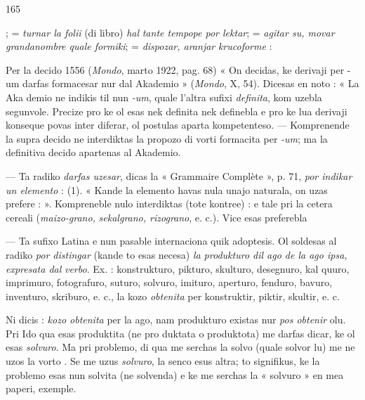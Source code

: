 \begin{VUpage}[169]{165}

\VUcontinue
{};  = \textit{turnar la folii} (di libro) \textit{hal}\cc
\textit{tante tempope por lektar};  = \textit{agitar su, movar}\nl
\textit{grandanombre quale formiki};  = \textit{dispozar, aranjar}\nl
\textit{krucoforme} : \nl
{}

Per la decido 1556 (\textit{Mondo}, marto 1922, pag. 68) « On\nl
decidas, ke derivaji per -um darfas formacesar nur dal\nl
Akademio » (\textit{Mondo}, X, 54). Dicesas en noto : « La Aka\cc
demio ne indikis til nun \textit{-um}, quale l'altra sufixi \textit{definita},\nl
kom uzebla segunvole. Precize pro ke ol esas nek definita\nl
nek definebla e pro ke lua derivaji konseque povas inter\cc
diferar, ol postulas aparta kompetenteso. --- Komprenende\nl
la supra decido ne interdiktas la propozo di vorti formacita\nl
per \textit{-um}; ma la definitiva decido apartenas al Akademio.

 --- Ta radiko \textit{darfas uzesar}, dicas la « Grammaire\nl
Complète », p. 71, \textit{por indikar un elemento} : \cc
{} (1). « Kande la elemento havas nula unajo naturala,\nl
on uzas prefere  :  ». Kompreneble\nl
nulo interdiktas (tote kontree) : \nl
{} e tale pri la cetera cereali (\textit{maizo-grano,}\nl
\textit{sekalgrano, rizograno}, e. c.). Vice  esas preferebla\nl
{}

 --- Ta sufixo Latina e nun pasable internaciona quik\nl
adoptesis. Ol soldesas al radiko \textit{por distingar} (kande to esas\nl
necesa) \textit{la produkturo dil ago de la ago ipsa, expresata dal}\nl
\textit{verbo}. Ex. : konstrukturo, pikturo, skulturo, desegnuro, kal\cc
quuro, imprimuro, fotografuro, suturo, solvuro, imituro,\nl
aperturo, fenduro, bavuro, inventuro, skriburo, e. c., la kozo\nl
\textit{obtenita} per konstruktir, piktir, skultir, e. c.

Ni dicis : \textit{kozo obtenita} per la ago, nam produkturo existas\nl
nur \textit{pos obtenir} olu. Pri Ido qua esas produktita (ne pro\cc
duktata o produktota) me darfas dicar, ke ol esas \textit{solvuro}. Ma\nl
pri problemo, di qua me serchas la solvo (quale solvor lu) me\nl
ne uzos la vorto . Se me uzus \textit{solvuro}, la senco esus\nl
altra; to signifikus, ke la problemo esas nun solvita (ne\nl
solvenda) e ke me serchas la « solvuro » en mea paperi,\nl
exemple.
\end{VUpage}

